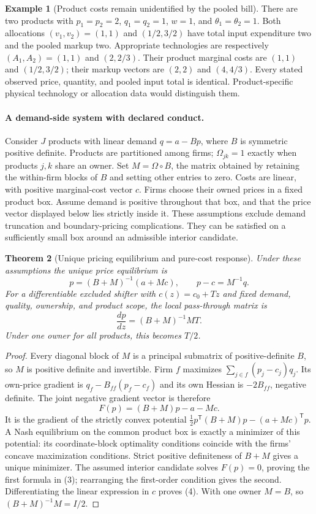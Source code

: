 \documentclass[11pt]{article}
\newtheorem{theorem}{Theorem}
\theoremstyle{definition}
\newtheorem{example}[theorem]{Example}
\begin{document}
\begin{example}[Product costs remain unidentified by the pooled bill]
There are two products with $p_1=p_2=2$, $q_1=q_2=1$, $w=1$, and $\theta_1=\theta_2=1$. Both allocations $(v_1,v_2)=(1,1)$ and $(1/2,3/2)$ have total input expenditure two and the pooled markup two. Appropriate technologies are respectively $(A_1,A_2)=(1,1)$ and $(2,2/3)$. Their product marginal costs are $(1,1)$ and $(1/2,3/2)$; their markup vectors are $(2,2)$ and $(4,4/3)$. Every stated observed price, quantity, and pooled input total is identical. Product-specific physical technology or allocation data would distinguish them.
\end{example}

\paragraph{A demand-side system with declared conduct.}
Consider $J$ products with linear demand $q=a-Bp$, where $B$ is symmetric positive definite. Products are partitioned among firms; $\Omega_{jk}=1$ exactly when products $j,k$ share an owner. Set $M=\Omega\circ B$, the matrix obtained by retaining the within-firm blocks of $B$ and setting other entries to zero. Costs are linear, with positive marginal-cost vector $c$. Firms choose their owned prices in a fixed product box. Assume demand is positive throughout that box, and that the price vector displayed below lies strictly inside it. These assumptions exclude demand truncation and boundary-pricing complications. They can be satisfied on a sufficiently small box around an admissible interior candidate.

\begin{theorem}[Unique pricing equilibrium and pure-cost response]
Under these assumptions the unique price equilibrium is
\[
 p=(B+M)^{-1}(a+Mc),\qquad
 p-c=M^{-1}q.
 \tag{3}
\]
For a differentiable excluded shifter with $c(z)=c_0+Tz$ and fixed demand, quality, ownership, and product scope, the local pass-through matrix is
\[
 \frac{dp}{dz}=(B+M)^{-1}MT.
 \tag{4}
\]
Under one owner for all products, this becomes $T/2$.
\end{theorem}
\begin{proof}
Every diagonal block of $M$ is a principal submatrix of positive-definite $B$, so $M$ is positive definite and invertible. Firm $f$ maximizes $\sum_{j\in f}(p_j-c_j)q_j$. Its own-price gradient is $q_f-B_{ff}(p_f-c_f)$ and its own Hessian is $-2B_{ff}$, negative definite. The joint negative gradient vector is therefore
\[
 F(p)=(B+M)p-a-Mc.
\]
It is the gradient of the strictly convex potential
$\tfrac12p^{\mathsf T}(B+M)p-(a+Mc)^{\mathsf T}p$. A Nash equilibrium on the common product box is exactly a minimizer of this potential: its coordinate-block optimality conditions coincide with the firms' concave maximization conditions. Strict positive definiteness of $B+M$ gives a unique minimizer. The assumed interior candidate solves $F(p)=0$, proving the first formula in (3); rearranging the first-order condition gives the second. Differentiating the linear expression in $c$ proves (4). With one owner $M=B$, so $(B+M)^{-1}M=I/2$.
\end{proof}
\end{document}
